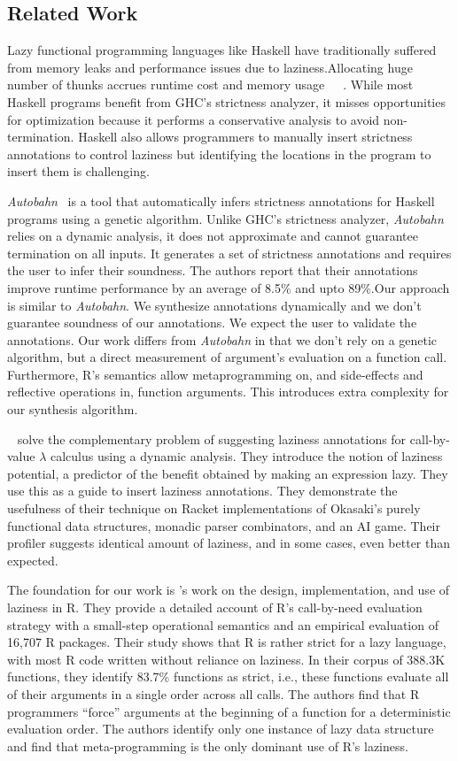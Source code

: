 \documentclass[review,nonacm,screen,acmsmall,anonymous=true]{acmart}
\begin{document}
\subsection{Related Work}
Lazy functional programming languages like Haskell have traditionally suffered
from memory leaks and performance issues due to laziness.Allocating huge number
of thunks accrues runtime cost and memory
usage~\cite{transformopt}~\cite{stricteffective}~\cite{opteval}. While most
Haskell programs benefit from GHC's strictness analyzer, it misses opportunities
for optimization because it performs a conservative analysis to avoid
non-termination. Haskell also allows programmers to manually insert strictness
annotations to control laziness but identifying the locations in the program to
insert them is challenging.


\emph{Autobahn}~\cite{autobahn} is a tool that automatically infers strictness
annotations for Haskell programs using a genetic algorithm. Unlike GHC's
strictness analyzer, \emph{Autobahn} relies on a dynamic analysis, it does not
approximate and cannot guarantee termination on all inputs. It generates a set
of strictness annotations and requires the user to infer their soundness. The
authors report that their annotations improve runtime performance by an average
of 8.5\% and upto 89\%.Our approach is similar to \emph{Autobahn}. We synthesize
annotations dynamically and we don't guarantee soundness of our annotations. We
expect the user to validate the annotations. Our work differs from
\emph{Autobahn} in that we don't rely on a genetic algorithm, but a direct
measurement of argument's evaluation on a function call. Furthermore, R's
semantics allow metaprogramming on, and side-effects and reflective operations
in, function arguments. This introduces extra complexity for our synthesis
algorithm.

~\cite{lazyprof} solve the complementary problem of suggesting laziness
annotations for call-by-value $\lambda$ calculus using a dynamic analysis. They
introduce the notion of laziness potential, a predictor of the benefit obtained
by making an expression lazy. They use this as a guide to insert laziness
annotations. They demonstrate the usefulness of their technique on Racket
implementations of Okasaki's purely functional data structures, monadic parser
combinators, and an AI game. Their profiler suggests identical amount of
laziness, and in some cases, even better than expected.


The foundation for our work is \cite{oopsla19b}'s work on the design,
implementation, and use of laziness in R. They provide a detailed account of R's
call-by-need evaluation strategy with a small-step operational semantics and an
empirical evaluation of 16,707 R packages. Their study shows that R is rather
strict for a lazy language, with most R code written without reliance on
laziness. In their corpus of 388.3K functions, they identify 83.7\% functions as
strict, i.e., these functions evaluate all of their arguments in a single order
across all calls. The authors find that R programmers ``force'' arguments at the
beginning of a function for a deterministic evaluation order. The authors
identify only one instance of lazy data structure and find that meta-programming
is the only dominant use of R's laziness.
\end{document}
